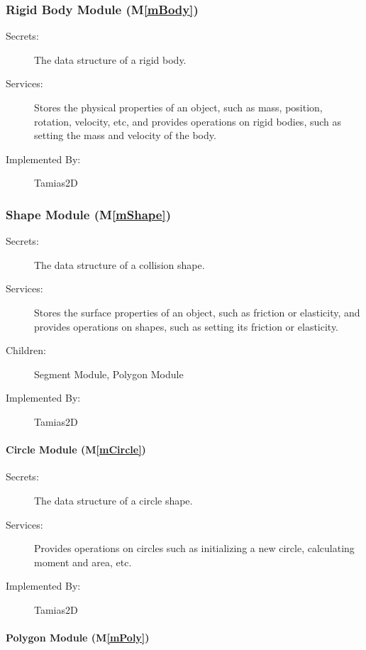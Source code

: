 \documentclass[12pt]{article}
\newcommand{\mref}[1]{M\ref{#1}}
\newcommand{\progname}{Tamias2D}
\begin{document}
\subsubsection{Rigid Body Module (\mref{mBody})}

\begin{description}
\item[Secrets:]The data structure of a rigid body.
\item[Services:]Stores the physical properties of an object, such as mass, 
position, rotation, velocity, etc, and provides operations on rigid bodies, such as setting the mass and velocity of the body.

\item[Implemented By:] {\progname}
\end{description}

\subsubsection{Shape Module (\mref{mShape})}

\begin{description}
\item[Secrets:]The data structure of a collision shape.
\item[Services:]Stores the surface properties of an object, such as friction or elasticity, and provides operations on shapes, such as setting its friction or elasticity.
\item[Children:] Segment Module, Polygon Module
\item[Implemented By:] {\progname}
\end{description}

\paragraph{Circle Module (\mref{mCircle})}

\begin{description}
	\item[Secrets:] The data structure of a circle shape.
	\item[Services:] Provides operations on circles such as initializing a new circle, calculating moment and area, etc.
	\item[Implemented By:] {\progname}
\end{description}


\paragraph{Polygon Module (\mref{mPoly})}
\end{document}
